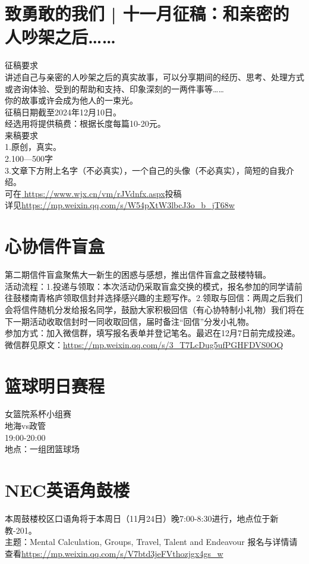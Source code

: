\documentclass[letterpaper, 12pt]{article}
\begin{document}
\begin{multicols}{2}
\section{致勇敢的我们 | 十一月征稿：和亲密的人吵架之后……}
征稿要求\\
讲述自己与亲密的人吵架之后的真实故事，可以分享期间的经历、思考、处理方式或咨询体验、受到的帮助和支持、印象深刻的一两件事等……\\
你的故事或许会成为他人的一束光。\\
征稿日期截至2024年12月10日。\\
经选用将提供稿费：根据长度每篇10-20元。\\
来稿要求\\
1.原创，真实。\\
2.100—500字\\
3.文章下方附上名字（不必真实），一个自己的头像（不必真实），简短的自我介绍。\\
可在\url{ https://www.wjx.cn/vm/rJVdnfx.aspx}投稿\\
详见\url{https://mp.weixin.qq.com/s/W54pXtW3lbcJ3o_b_jT68w}
\section{心协信件盲盒}
第二期信件盲盒聚焦大一新生的困惑与感想，推出信件盲盒之鼓楼特辑。\\
活动流程：1.投递与领取：本次活动仍采取盲盒交换的模式，报名参加的同学请前往鼓楼南青格庐领取信封并选择感兴趣的主题写作。2.领取与回信：两周之后我们会将信件随机分发给报名同学，鼓励大家积极回信（有心协特制小礼物）我们将在下一期活动收取信封时一同收取回信，届时备注“回信”分发小礼物。\\
参加方式：加入微信群，填写报名表单并登记笔名。最迟在12月7日前完成投递。\\
微信群见原文：\url{https://mp.weixin.qq.com/s/3_T7LcDug5ufPGHFDVS0OQ}
\section{篮球明日赛程}
女篮院系杯小组赛\\
地海vs政管\\
19:00-20:00\\
地点：一组团篮球场
\section{NEC英语角鼓楼}
本周鼓楼校区口语角将于本周日（11月24日）晚7:00-8:30进行，地点位于新教-201。\\
主题：Mental Calculation, Groups, Travel, Talent and Endeavour
报名与详情请查看\url{https://mp.weixin.qq.com/s/V7btd3jeFVthozjgx4gs_w}\\

\end{multicols}
\end{document}
